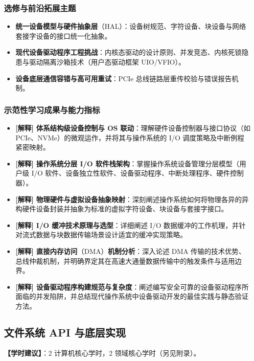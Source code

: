 \subsubsection{选修与前沿拓展主题}
\begin{itemize}\setlength{\itemsep}{0pt}\setlength{\parskip}{0pt}
    \item \textbf{统一设备模型与硬件抽象层}（HAL）：设备树规范、字符设备、块设备与网络套接字设备的接口统一化抽象。
    \item \textbf{现代设备驱动程序工程挑战}：内核态驱动的设计原则、并发竞态、内核死锁隐患与驱动隔离沙箱技术（用户态驱动框架 UIO/VFIO）。
    \item \textbf{设备底层通信容错与高可用重试}：PCIe 总线链路层重传校验与错误报告机制。
\end{itemize}

\subsubsection{示范性学习成果与能力指标}
\begin{itemize}\setlength{\itemsep}{0pt}\setlength{\parskip}{0pt}
    \item \textbf{[解释] 体系结构级设备控制与 OS 联动}：理解硬件设备控制器与接口协议（如 PCIe、NVMe）的微观运作，并将其与操作系统的 I/O 调度策略及中断例程紧密映射。
    \item \textbf{[解释] 操作系统分层 I/O 软件栈架构}：掌握操作系统设备管理分层模型（用户级 I/O 软件、设备独立性软件、设备驱动程序、中断处理程序、硬件控制器）。
    \item \textbf{[解释] 物理硬件与虚拟设备抽象映射}：深刻阐述操作系统如何将物理各异的异构硬件设备封装并抽象为标准的虚拟字符设备、块设备与套接字接口。
    \item \textbf{[解释] I/O 缓冲技术原理与选型}：详细阐述 I/O 数据缓冲的工作机理，并针对流式数据与块数据传输场景设计适宜的缓冲实现策略。
    \item \textbf{[解释] 直接内存访问}（DMA）\textbf{机制分析}：深入论述 DMA 传输的技术优势、总线仲裁机制，并明确界定其在高速大通量数据传输中的触发条件与适用边界。
    \item \textbf{[解释] 设备驱动程序构建规范与复杂度}：阐述编写安全可靠的设备驱动程序所面临的并发陷阱，并总结现代操作系统中设备驱动开发的最佳实践与静态验证方法。
\end{itemize}

\subsection{文件系统 API 与底层实现}
\textbf{【学时建议】}：2 计算机核心学时，2 领域核心学时（另见附录）。

